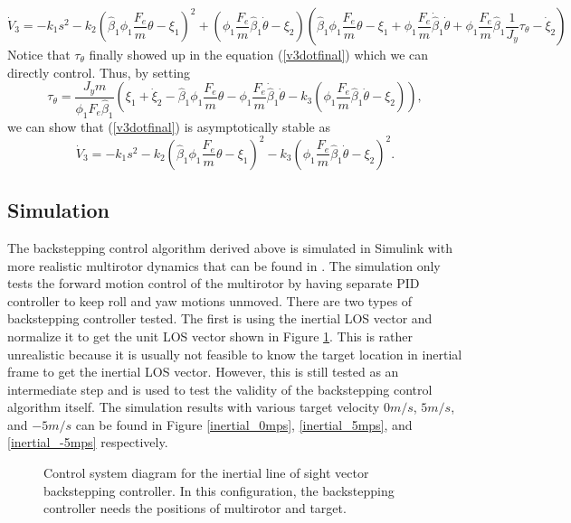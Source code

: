 \begin{equation}
\dot{V}_3=-k_1s^2-k_2(\hat{\beta}_1\phi_1\frac{F_e}{m}\theta-\xi_1)^2+(\phi_1\frac{F_e}{m}\hat{\beta}_1\dot{\theta}-\xi_2)
(\hat{\beta}_1\phi_1\frac{F_e}{m}\theta-\xi_1+\phi_1\frac{F_e}{m}\dot{\hat{\beta}}_1\dot{\theta}+\phi_1\frac{F_e}{m}\hat{\beta}_1\frac{1}{J_y}\tau_\theta-\dot{\xi}_2)
\label{v3dotfinal}
\end{equation}
Notice that $\tau_\theta$ finally showed up in the equation (\ref{v3dotfinal}) which we can directly control. Thus, by setting 
\begin{equation}
\tau_\theta=\frac{J_ym}{\phi_1F_e\hat{\beta}_1}
(\xi_1+\dot{\xi}_2-\hat{\beta}_1\phi_1\frac{F_e}{m}\theta-\phi_1\frac{F_e}{m}\dot{\hat{\beta}}_1\dot{\theta}-k_3(\phi_1\frac{F_e}{m}\hat{\beta}_1\dot{\theta}-\xi_2)),
\end{equation}
we can show that (\ref{v3dotfinal}) is asymptotically stable as
\begin{equation}
\dot{V}_3=-k_1s^2-k_2(\hat{\beta}_1\phi_1\frac{F_e}{m}\theta-\xi_1)^2-k_3(\phi_1\frac{F_e}{m}\hat{\beta}_1\dot{\theta}-\xi_2)^2.
\end{equation}

\subsection{Simulation}
The backstepping control algorithm derived above is simulated in Simulink with more realistic multirotor dynamics that can be found in {\cite{Beard2008}}. The simulation only tests the forward motion control of the multirotor by having separate PID controller to keep roll and yaw motions unmoved. There are two types of backstepping controller tested. The first is using the inertial LOS vector and normalize it to get the unit LOS vector shown in Figure \ref{system_inertial}. This is rather unrealistic because it is usually not feasible to know the target location in inertial frame to get the inertial LOS vector. However, this is still tested as an intermediate step and is used to test the validity of the backstepping control algorithm itself. The simulation results with various target velocity $0m/s$, $5m/s$, and $-5m/s$ can be found in Figure \ref{inertial_0mps}, \ref{inertial_5mps}, and \ref{inertial_-5mps} respectively.
\begin{figure}[thpb]
	\centering
	\caption{Control system diagram for the inertial line of sight vector backstepping controller. In this configuration, the backstepping controller needs the positions of multirotor and target.}
	\label{system_inertial}
\end{figure}


